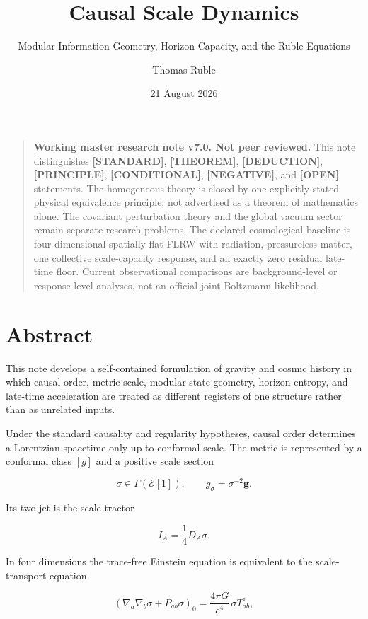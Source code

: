 \documentclass[
  11pt,
  letterpaper,
]{article}
\title{Causal Scale Dynamics}
\subtitle{Modular Information Geometry, Horizon Capacity, and the Ruble
Equations}
\author{Thomas Ruble}
\date{21 August 2026}
\begin{document}
\maketitle

{
\hypersetup{linkcolor=}
\setcounter{tocdepth}{3}
\tableofcontents
}
\begin{quote}
\textbf{Working master research note v7.0. Not peer reviewed.} This note
distinguishes \textbf{{[}STANDARD{]}}, \textbf{{[}THEOREM{]}},
\textbf{{[}DEDUCTION{]}}, \textbf{{[}PRINCIPLE{]}},
\textbf{{[}CONDITIONAL{]}}, \textbf{{[}NEGATIVE{]}}, and
\textbf{{[}OPEN{]}} statements. The homogeneous theory is closed by one
explicitly stated physical equivalence principle, not advertised as a
theorem of mathematics alone. The covariant perturbation theory and the
global vacuum sector remain separate research problems. The declared
cosmological baseline is four-dimensional spatially flat FLRW with
radiation, pressureless matter, one collective scale-capacity response,
and an exactly zero residual late-time floor. Current observational
comparisons are background-level or response-level analyses, not an
official joint Boltzmann likelihood.
\end{quote}

\section*{Abstract}\label{abstract}

This note develops a self-contained formulation of gravity and cosmic
history in which causal order, metric scale, modular state geometry,
horizon entropy, and late-time acceleration are treated as different
registers of one structure rather than as unrelated inputs.

Under the standard causality and regularity hypotheses, causal order
determines a Lorentzian spacetime only up to conformal scale. The metric
is represented by a conformal class \([g]\) and a positive scale section

\[
\sigma\in\Gamma(\mathcal E[1]),
\qquad
g_\sigma=\sigma^{-2}\boldsymbol g.
\]

Its two-jet is the scale tractor

\[
I_A=\frac14D_A\sigma.
\]

In four dimensions the trace-free Einstein equation is equivalent to the
scale-transport equation

\[
\boxed{
\left(\nabla_a\nabla_b\sigma+P_{ab}\sigma\right)_0
=\frac{4\pi G}{c^4}\,\sigma T_{ab}^{\circ},
}
\]
\end{document}
